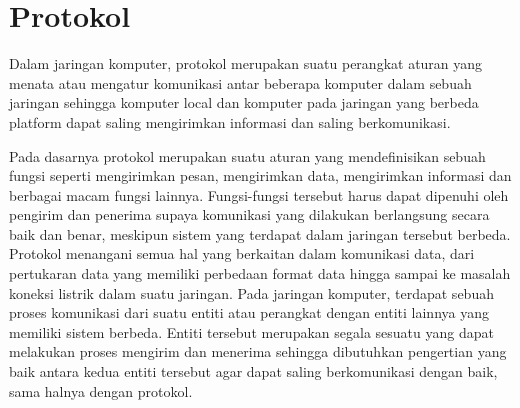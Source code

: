 \section{Protokol}
Dalam jaringan komputer, protokol merupakan suatu perangkat aturan yang menata atau mengatur komunikasi antar beberapa komputer dalam sebuah jaringan sehingga komputer local dan komputer pada jaringan yang berbeda platform dapat saling mengirimkan informasi dan saling berkomunikasi.

Pada dasarnya protokol merupakan suatu aturan yang mendefinisikan sebuah fungsi seperti mengirimkan pesan, mengirimkan data, mengirimkan informasi dan berbagai macam fungsi lainnya. Fungsi-fungsi tersebut harus dapat dipenuhi oleh pengirim dan penerima supaya komunikasi yang dilakukan berlangsung secara baik dan benar, meskipun sistem yang terdapat dalam jaringan tersebut berbeda. Protokol menangani semua hal yang berkaitan dalam komunikasi data, dari pertukaran data yang memiliki perbedaan format data hingga sampai ke masalah koneksi listrik dalam suatu jaringan. Pada jaringan komputer, terdapat sebuah proses komunikasi dari suatu entiti atau perangkat dengan entiti lainnya yang memiliki sistem berbeda. Entiti tersebut merupakan segala sesuatu yang dapat melakukan proses mengirim dan menerima sehingga dibutuhkan pengertian yang baik antara kedua entiti tersebut agar dapat saling berkomunikasi dengan baik, sama halnya dengan protokol.


